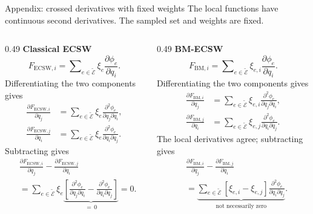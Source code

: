 \documentclass[aspectratio=169]{beamer}
\begin{document}
\begin{frame}{Appendix: crossed derivatives with fixed weights}
\hypertarget{bmecsw-gradient-proof}{}
\footnotesize
\setlength{\parskip}{0pt}
\setlength{\abovedisplayskip}{3pt}
\setlength{\belowdisplayskip}{3pt}
The local functions have continuous second derivatives. The sampled set and weights are fixed.
\begin{columns}[T,onlytextwidth]
\begin{column}{0.49\textwidth}
\textbf{Classical ECSW}
\[
  F_{\mathrm{ECSW},i}
  =\sum\nolimits_{e\in\widetilde{\mathcal E}}\xi_e\frac{\partial\phi_e}{\partial q_i}.
\]
Differentiating the two components gives
\[
\begin{aligned}
  \frac{\partial F_{\mathrm{ECSW},i}}{\partial q_j}
  &=\sum\nolimits_{e\in\widetilde{\mathcal E}}\xi_e
       \frac{\partial^2\phi_e}{\partial q_j\partial q_i},\\[4pt]
  \frac{\partial F_{\mathrm{ECSW},j}}{\partial q_i}
  &=\sum\nolimits_{e\in\widetilde{\mathcal E}}\xi_e
       \frac{\partial^2\phi_e}{\partial q_i\partial q_j}.
\end{aligned}
\]
Subtracting gives
\[
\begin{aligned}
  &\frac{\partial F_{\mathrm{ECSW},i}}{\partial q_j}
   -\frac{\partial F_{\mathrm{ECSW},j}}{\partial q_i}\\[3pt]
  &=\sum\nolimits_{e\in\widetilde{\mathcal E}}\xi_e
    \underbrace{\left[
    \frac{\partial^2\phi_e}{\partial q_j\partial q_i}
    -\frac{\partial^2\phi_e}{\partial q_i\partial q_j}
    \right]}_{=\,0}
    =0.
\end{aligned}
\]
\end{column}
\begin{column}{0.49\textwidth}
\textbf{BM-ECSW}
\[
  F_{\mathrm{BM},i}
  =\sum\nolimits_{e\in\widetilde{\mathcal E}}\xi_{e,i}\frac{\partial\phi_e}{\partial q_i}.
\]
Differentiating the two components gives
\[
\begin{aligned}
  \frac{\partial F_{\mathrm{BM},i}}{\partial q_j}
  &=\sum\nolimits_{e\in\widetilde{\mathcal E}}\xi_{e,i}
       \frac{\partial^2\phi_e}{\partial q_j\partial q_i},\\[4pt]
  \frac{\partial F_{\mathrm{BM},j}}{\partial q_i}
  &=\sum\nolimits_{e\in\widetilde{\mathcal E}}\xi_{e,j}
       \frac{\partial^2\phi_e}{\partial q_i\partial q_j}.
\end{aligned}
\]
The local derivatives agree; subtracting gives
\[
\begin{aligned}
  &\frac{\partial F_{\mathrm{BM},i}}{\partial q_j}
   -\frac{\partial F_{\mathrm{BM},j}}{\partial q_i}\\[3pt]
  &=\underbrace{\sum\nolimits_{e\in\widetilde{\mathcal E}}[\xi_{e,i}-\xi_{e,j}]
    \frac{\partial^2\phi_e}{\partial q_i\partial q_j}}_{\text{not necessarily zero}}.
\end{aligned}
\]
\end{column}
\end{columns}
\vfill\hfill\hyperlink{bmecsw-weighting-comparison}{}
\quad\hyperlink{bmecsw-mechanical-structure}{}
\end{frame}
\end{document}
